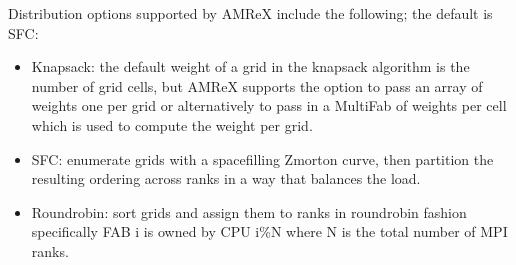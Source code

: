 \documentclass[letterpaper,10pt,english]{sphinxmanual}
\begin{document}
\begin{sphinxVerbatim}[commandchars=\\\{\}]
         
\end{sphinxVerbatim}

\sphinxAtStartPar
Distribution options supported by AMReX include the following; the default is SFC:
\begin{itemize}
\item {} 
\sphinxAtStartPar
Knapsack: the default weight of a grid in the knapsack algorithm is the number of grid cells,
but AMReX supports the option to pass an array of weights \textendash{} one per grid \textendash{} or alternatively
to pass in a MultiFab of weights per cell which is used to compute the weight per grid.

\item {} 
\sphinxAtStartPar
SFC: enumerate grids with a space\sphinxhyphen{}filling Z\sphinxhyphen{}morton curve, then partition the
resulting ordering across ranks in a way that balances the load.

\item {} 
\sphinxAtStartPar
Round\sphinxhyphen{}robin: sort grids and assign them to ranks in round\sphinxhyphen{}robin fashion \textendash{} specifically
FAB i is owned by CPU i\%N where N is the total number of MPI ranks.

\end{itemize}
\end{document}
